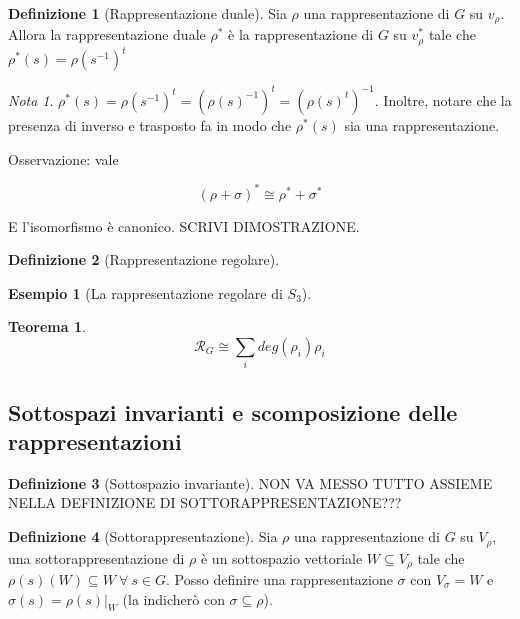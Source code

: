 \documentclass[11pt]{article}
\theoremstyle{plain}
\newtheorem{thm}{Teorema}[section]
\theoremstyle{definition}
\newtheorem{defn}{Definizione}[section]
\newtheorem{exmp}{Esempio}[section]
\theoremstyle{remark}
\newtheorem*{note}{Nota}
\newcommand{\dsum}{\displaystyle\sum}
\begin{document}
\begin{defn}[Rappresentazione duale]
Sia $\rho$ una rappresentazione di $G$ su $v_\rho$. Allora la rappresentazione duale $\rho^*$ è la rappresentazione di $G$ su $v_\rho ^*$ tale che $\rho^*(s)=\rho(s^{-1})^t$
\label{defn:rappresentazione duale}
\end{defn}

\begin{note}
$\rho^*(s)=\rho(s^{-1})^t=\left(\rho(s)^{-1}\right)^t=\left(\rho(s)^t\right)^{-1}$. Inoltre, notare che la presenza di inverso e trasposto fa in modo che $\rho^*(s)$ sia una rappresentazione.
\end{note}


Osservazione: vale

\[ (\rho + \sigma)^* \cong \rho^* + \sigma^* \]

E l'isomorfismo è canonico. SCRIVI DIMOSTRAZIONE.





\begin{defn}[Rappresentazione regolare]

\label{defn:rappresentazione regolare}
\end{defn}

\begin{exmp}[La rappresentazione regolare di $S_3$]


\end{exmp}


\begin{thm}

\[\mathcal{R}_G \cong \dsum_i deg(\rho_i) \rho_i \]

\end{thm}



\subsection{Sottospazi invarianti e scomposizione delle rappresentazioni}


\begin{defn}[Sottospazio invariante]
NON VA MESSO TUTTO ASSIEME NELLA DEFINIZIONE DI SOTTORAPPRESENTAZIONE???

\end{defn}

\begin{defn}[Sottorappresentazione]
Sia $\rho$ una rappresentazione di $G$ su $V_{\rho}$, una sottorappresentazione di $\rho$ è un sottospazio vettoriale $W\subseteq V_{\rho}$ tale che $\rho(s)(W)\subseteq W\ \forall\ s\in G$. Posso definire una rappresentazione $\sigma$ con $V_{\sigma}=W$ e $\sigma(s)=\rho(s)|_W$ (la indicherò con $\sigma\subseteq \rho$).
\end{defn}
\end{document}
